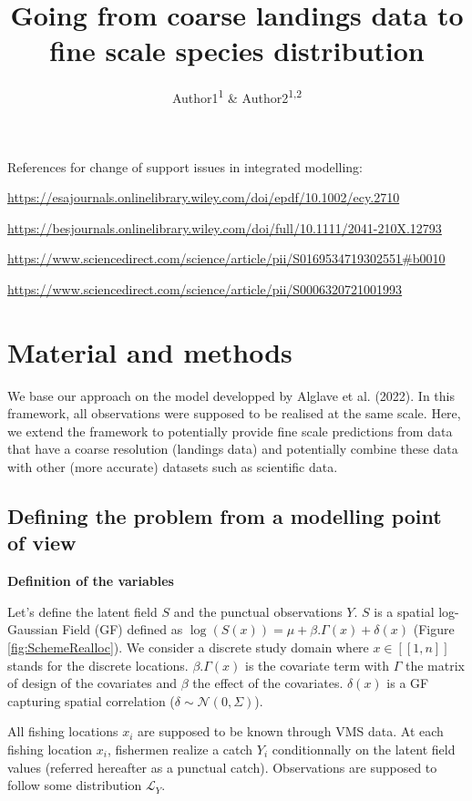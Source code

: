 \documentclass[
  english,
  man,floatsintext]{apa6}
\title{Going from coarse landings data to fine scale species distribution}
\author{Author1\textsuperscript{1} \& Author2\textsuperscript{1,2}}
\date{}
\affiliation{\vspace{0.5cm}\textsuperscript{1} Instit1\\\textsuperscript{2} Instit2}
\begin{document}
\maketitle

References for change of support issues in integrated modelling:

\url{https://esajournals.onlinelibrary.wiley.com/doi/epdf/10.1002/ecy.2710}

\url{https://besjournals.onlinelibrary.wiley.com/doi/full/10.1111/2041-210X.12793}

\url{https://www.sciencedirect.com/science/article/pii/S0169534719302551\#b0010}

\url{https://www.sciencedirect.com/science/article/pii/S0006320721001993}

\hypertarget{material-and-methods}{%
\section{Material and methods}\label{material-and-methods}}

We base our approach on the model developped by Alglave et al. (2022). In this framework, all observations were supposed to be realised at the same scale. Here, we extend the framework to potentially provide fine scale predictions from data that have a coarse resolution (landings data) and potentially combine these data with other (more accurate) datasets such as scientific data.

\hypertarget{defining-the-problem-from-a-modelling-point-of-view}{%
\subsection{Defining the problem from a modelling point of view}\label{defining-the-problem-from-a-modelling-point-of-view}}

\textbf{Definition of the variables}

Let's define the latent field \(S\) and the punctual observations \(Y\). \(S\) is a spatial log-Gaussian Field (GF) defined as \(\log(S(x))=\mu+\beta . \Gamma(x) + \delta(x)\) (Figure \ref{fig:SchemeRealloc}). We consider a discrete study domain where \(x \in [\![1,n]\!]\) stands for the discrete locations. \(\beta . \Gamma(x)\) is the covariate term with \(\Gamma\) the matrix of design of the covariates and \(\beta\) the effect of the covariates. \(\delta(x)\) is a GF capturing spatial correlation (\(\delta \sim \mathcal{N}(0,\Sigma)\)).

All fishing locations \(x_i\) are supposed to be known through VMS data. At each fishing location \(x_i\), fishermen realize a catch \(Y_i\) conditionnally on the latent field values (referred hereafter as a punctual catch). Observations are supposed to follow some distribution \(\mathcal{L}_Y\).
\end{document}
